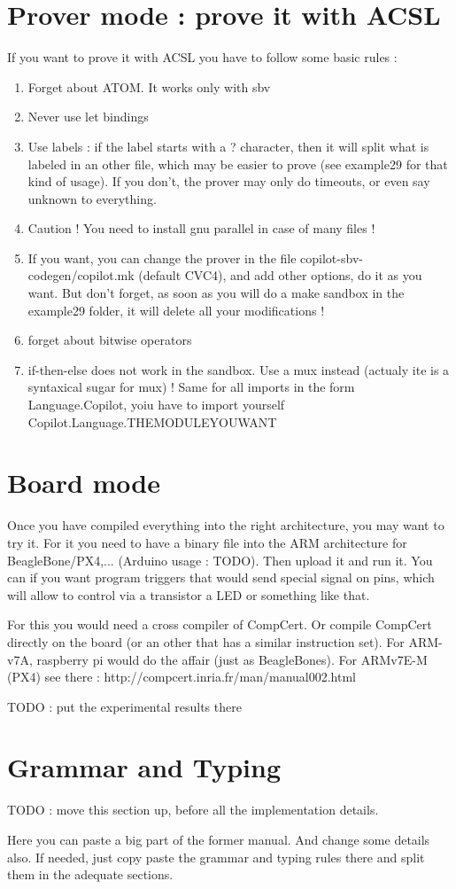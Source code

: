 \documentclass[11pt]{article}
\begin{document}
\section {Prover mode : prove it with ACSL}

If you want to prove it with ACSL you have to follow some basic rules :
\begin{enumerate}
\item Forget about ATOM. It works only with sbv
\item Never use let bindings
\item Use labels : if the label starts with a ? character, then it will split what is labeled in an other file, which may be easier to prove (see example29 for that kind of usage). If you don't, the prover may only do timeouts, or even say unknown to everything.
\item Caution ! You need to install gnu parallel in case of many files !
\item If you want, you can change the prover in the file copilot-sbv-codegen/copilot.mk (default CVC4), and add other options, do it as you want. But don't forget, as soon as you will do a make sandbox in the example29 folder, it will delete all your modifications !
\item forget about bitwise operators
\item if-then-else does not work in the sandbox. Use a mux instead (actualy ite is a syntaxical sugar for mux) ! Same for all imports in the form Language.Copilot, yoiu have to import yourself Copilot.Language.THEMODULEYOUWANT
\end{enumerate}

\section{Board mode}

Once you have compiled everything into the right architecture, you may want to try it. For it you need to have a binary file into the ARM architecture for BeagleBone/PX4,... (Arduino usage : TODO). Then upload it and run it. You can if you want program triggers that would send special signal on pins, which will allow to control via a transistor a LED or something like that. 

For this you would need a cross compiler of CompCert. Or compile CompCert directly on the board (or an other that has a similar instruction set). For ARM-v7A, raspberry pi would do the affair (just as BeagleBones). For ARMv7E-M (PX4) see there : http://compcert.inria.fr/man/manual002.html

TODO : put the experimental results there

\section{Grammar and Typing}
TODO : move this section up, before all the implementation details.

Here you can paste a big part of the former manual. And change some details also.
If needed, just copy paste the grammar and typing rules there and split them in the adequate sections.



\end{document}
